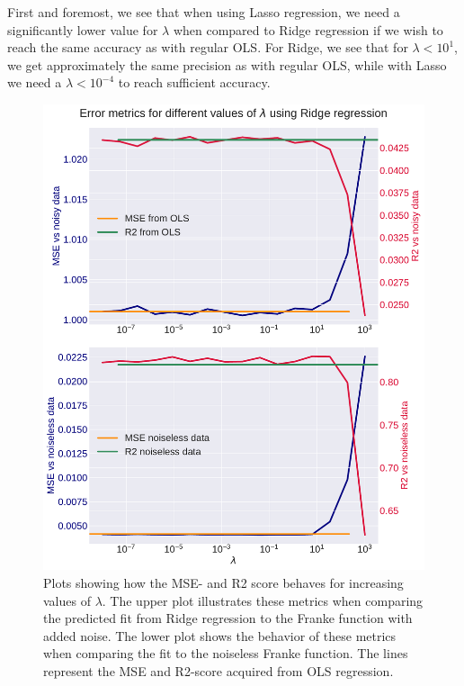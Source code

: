\documentclass[10pt, twocolumn]{article}
\begin{document}
First and foremost, we see that when using Lasso regression, we need a significantly lower value for $\lambda$ when compared to Ridge regression if we wish to reach the same accuracy as with regular OLS. For Ridge, we see that for $\lambda < 10^1$, we get approximately the same precision as with regular OLS, while with Lasso we need a $\lambda < 10^{-4}$ to reach sufficient accuracy. 
\begin{figure}[h!]
    \centering
    \includegraphics[scale=0.4]{../figs/errormetrics_lambda_ridge_franke.pdf}
    \caption{Plots showing how the MSE- and R2 score behaves for increasing values of $\lambda$. The upper plot illustrates these metrics when comparing the predicted fit from Ridge regression to the Franke function with added noise. The lower plot shows the behavior of these metrics when comparing the fit to the noiseless Franke function. The lines represent the MSE and R2-score acquired from OLS regression.}
    \label{fig:lambda_ridge_franke}
\end{figure}
\end{document}
